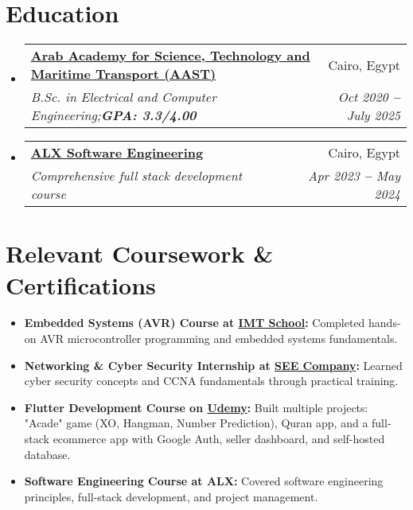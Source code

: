 \documentclass[letterpaper,10.5pt]{article}
\makeatletter
\newcommand{\resumeItem}[1]{
  \item\small{
    {#1 \vspace{-2pt}}
  }
}
\newcommand{\resumeSubheading}[4]{
  \vspace{-2pt}\item
    \begin{tabular*}{0.97\textwidth}[t]{l@{\extracolsep{\fill}}r}
      \textbf{#1} & #2 \\
      \textit{\small#3} & \textit{\small #4} \\
    \end{tabular*}\vspace{-7pt}
}
\newcommand{\resumeEducationHeading}[6]{
  \vspace{-2pt}\item
    \begin{tabular*}{0.97\textwidth}[t]{l@{\extracolsep{\fill}}r}
      \textbf{#1} & #2 \\
      \textit{\small#3} & \textit{\small #4} \\
      \textit{\small#5} & \textit{\small #6} \\
    \end{tabular*}\vspace{-5pt}
}
\newcommand{\resumeSubHeadingListStart}{\begin{itemize}[leftmargin=0.15in, label={}]}
\newcommand{\resumeSubHeadingListEnd}{\end{itemize}}
\makeatother
\begin{document}


\section{Education}
  \resumeSubHeadingListStart
    
    \resumeSubheading
      {\href{https://aast.edu/en/index.php?from=edurank.org}{Arab Academy for Science, Technology and Maritime Transport (AAST)}}{Cairo, Egypt}
      {B.Sc. in Electrical and Computer Engineering;\textbf{GPA: 3.3/4.00}}{Oct 2020 \textbf{--} July 2025}
      
    \resumeSubheading
    {\href{https://tech.alxafrica.com/hubfs/ALX-Software-Engineering-Curriculum.pdf?hsLang=en}{ALX Software Engineering}}{Cairo, Egypt}
    {Comprehensive full stack development course}{Apr 2023 \textbf{--} May 2024}

    
  \resumeSubHeadingListEnd


\section{Relevant Coursework \& Certifications}
  \resumeSubHeadingListStart
    \resumeItem{\textbf{Embedded Systems (AVR) Course at \href{https://www.imtschool.com/}{IMT School}:} Completed hands-on AVR microcontroller programming and embedded systems fundamentals.}
    \resumeItem{\textbf{Networking \& Cyber Security Internship at \href{https://seegypt.com/}{SEE Company}:} Learned cyber security concepts and CCNA fundamentals through practical training.}
    \resumeItem{\textbf{Flutter Development Course on \href{https://www.udemy.com/share/101rfI3@KrQXcIQfUCfZKdb0xVqKLKdnx6689mXcLDpKdRQCCB3qYZEyTs9KuzFftgd7fqvAJA==/}{Udemy}:} Built multiple projects: "Acade" game (XO, Hangman, Number Prediction), Quran app, and a full-stack ecommerce app with Google Auth, seller dashboard, and self-hosted database.}
    \resumeItem{\textbf{Software Engineering Course at ALX:} Covered software engineering principles, full-stack development, and project management.}
  \resumeSubHeadingListEnd
\end{document}
